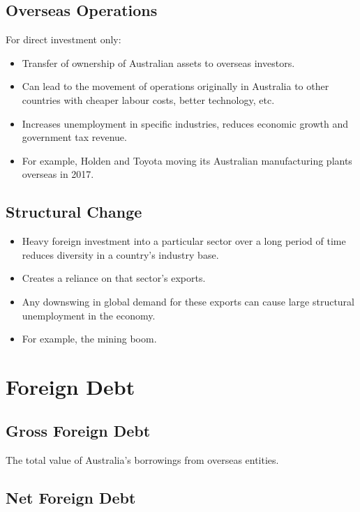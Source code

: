 \documentclass[a4paper,11pt]{report}
\begin{document}
\subsection{Overseas Operations}

For direct investment only:

\begin{itemize}
\item Transfer of ownership of Australian assets to overseas investors.
\item Can lead to the movement of operations originally in Australia to other
	countries with cheaper labour costs, better technology, etc.
\item Increases unemployment in specific industries, reduces economic growth
	and government tax revenue.
\item For example, Holden and Toyota moving its Australian manufacturing
	plants overseas in 2017.
\end{itemize}

\subsection{Structural Change}

\begin{itemize}
\item Heavy foreign investment into a particular sector over a long period of
	time reduces diversity in a country's industry base.
\item Creates a reliance on that sector's exports.
\item Any downswing in global demand for these exports can cause large
	structural unemployment in the economy.
\item For example, the mining boom.
\end{itemize}


\section{Foreign Debt}

\subsection{Gross Foreign Debt}

The total value of Australia's borrowings from overseas entities.

\subsection{Net Foreign Debt}
\end{document}

